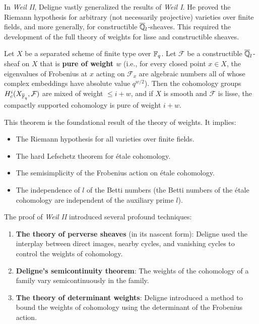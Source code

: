 In \textit{Weil II}, Deligne vastly generalized the results of \textit{Weil I}. He proved the Riemann hypothesis for arbitrary (not necessarily projective) varieties over finite fields, and more generally, for constructible \(\overline{\mathbb{Q}}_l\)-sheaves. This required the development of the full theory of weights for lisse and constructible sheaves.

\begin{theorem}
Let \(X\) be a separated scheme of finite type over \(\mathbb{F}_q\). Let \(\mathcal{F}\) be a constructible \(\overline{\mathbb{Q}}_l\)-sheaf on \(X\) that is \textbf{pure of weight \(w\)} (i.e., for every closed point \(x \in X\), the eigenvalues of Frobenius at \(x\) acting on \(\mathcal{F}_x\) are algebraic numbers all of whose complex embeddings have absolute value \(q^{w/2}\)). Then the cohomology groups \(H^i_c(X_{\overline{\mathbb{F}}_q}, \mathcal{F})\) are mixed of weight \(\leq i + w\), and if \(X\) is smooth and \(\mathcal{F}\) is lisse, the compactly supported cohomology is pure of weight \(i + w\).
\end{theorem}

This theorem is the foundational result of the theory of weights. It implies:
\begin{itemize}
    \item The Riemann hypothesis for all varieties over finite fields.
    \item The hard Lefschetz theorem for \'etale cohomology.
    \item The semisimplicity of the Frobenius action on \'etale cohomology.
    \item The independence of \(l\) of the Betti numbers (the Betti numbers of the \'etale cohomology are independent of the auxiliary prime \(l\)).
\end{itemize}

The proof of \textit{Weil II} introduced several profound techniques:
\begin{enumerate}
    \item \textbf{The theory of perverse sheaves} (in its nascent form): Deligne used the interplay between direct images, nearby cycles, and vanishing cycles to control the weights of cohomology.
    \item \textbf{Deligne's semicontinuity theorem}: The weights of the cohomology of a family vary semicontinuously in the family.
    \item \textbf{The theory of determinant weights}: Deligne introduced a method to bound the weights of cohomology using the determinant of the Frobenius action.
\end{enumerate}


